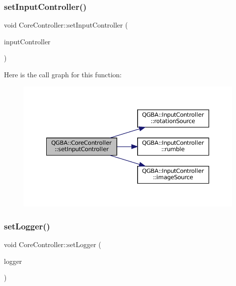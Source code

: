 \mbox{\label{class_q_g_b_a_1_1_core_controller_a6f475f57f41e5fe91d4cc93358bd6bfb}} 
\subsubsection{\texorpdfstring{set\+Input\+Controller()}{setInputController()}}
{\footnotesize\ttfamily void Core\+Controller\+::set\+Input\+Controller (\begin{DoxyParamCaption}\item[{\mbox{\hyperlink{class_q_g_b_a_1_1_input_controller}{Input\+Controller}} $\ast$}]{input\+Controller }\end{DoxyParamCaption})}

Here is the call graph for this function\+:
\nopagebreak
\begin{figure}[H]
\begin{center}
\leavevmode
\includegraphics[width=350pt]{class_q_g_b_a_1_1_core_controller_a6f475f57f41e5fe91d4cc93358bd6bfb_cgraph}
\end{center}
\end{figure}
\mbox{\label{class_q_g_b_a_1_1_core_controller_aabf966793a76ac2c77cb4f89def2c08f}} 
\subsubsection{\texorpdfstring{set\+Logger()}{setLogger()}}
{\footnotesize\ttfamily void Core\+Controller\+::set\+Logger (\begin{DoxyParamCaption}\item[{\mbox{\hyperlink{class_q_g_b_a_1_1_log_controller}{Log\+Controller}} $\ast$}]{logger }\end{DoxyParamCaption})}

